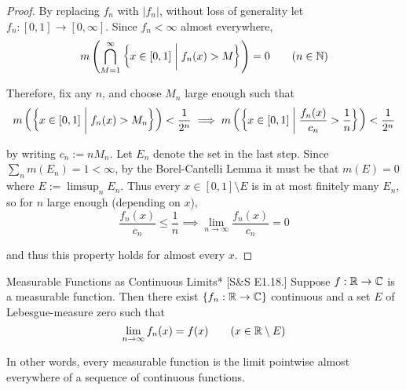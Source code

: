 \begin{proof}
    By replacing \(f_n\) with \(|f_n|\), without loss of generality let \(f_n : [0,1] \to [0, \infty]\). Since \(f_n < \infty\) almost everywhere, 
    \[
    m\left( \bigcap_{M = 1}^\infty \left\{ x \in [0, 1] \;\biggr\rvert\; f_n(x) > M \right\} \right) = 0
    \qquad (n \in \mathbb{N})
    \]

    Therefore, fix any \(n\), and choose \(M_n\) large enough such that 
    \[
    m\left( \left\{ x \in [0, 1] \;\biggr\rvert\; f_n(x) > M_n \right\} \right) < \frac{1}{2^n}
    \implies 
    m\left( \left\{ x \in [0, 1] \;\biggr\rvert\; \frac{f_n(x)}{c_n} > \frac{1}{n} \right\} \right) < \frac{1}{2^n}
    \]

    by writing \(c_n := nM_n\). Let \(E_n\) denote the set in the last step. Since \(\sum_{n} m(E_n) = 1 < \infty\), by the Borel-Cantelli Lemma it must be that \(m(E) = 0\) where \(E := \limsup_n E_n\). Thus every \(x \in [0, 1] \setminus E\) is in at most finitely many \(E_n\), so for \(n\) large enough (depending on \(x\)), 
    \[
    \frac{f_n(x)}{c_n} \leq \frac{1}{n} \implies \lim_{n \to \infty} \frac{f_n(x)}{c_n} = 0
    \]

    and thus this property holds for almost every \(x\). 
\end{proof}

\begin{problem}{Measurable Functions as Continuous Limits}*
    [S\&S E1.18.] Suppose \(f : \mathbb{R} \to \mathbb{C}\) is a measurable function. Then there exist \(\{f_n : \mathbb{R} \to \mathbb{C}\}\) continuous and a set \(E\) of Lebesgue-measure zero such that 
    \[
    \lim_{n \to \infty} f_n(x) = f(x) \qquad (x \in \mathbb{R} \setminus E)
    \]

    In other words, every measurable function is the limit pointwise almost everywhere of a sequence of continuous functions. 
\end{problem}

